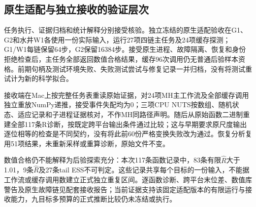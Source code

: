 \subsection{原生适配与独立接收的验证层次}
\label{sec:native-adapter-validation}
任务执行、证据归档和统计解释分别接受核验。独立冻结的原生适配验收在G1、G2和水井W1各使用一份实际输入，运行27项四链主任务及24项缓存探测；G1/W1每链保留64步，G2保留16384步。接受原生进程、故障隔离、恢复和身份拒绝检查后，主任务全部返回数值合格结果，缓存96次调用仍无普通后验样本资格。前期句柄及测试环境失败、失败测试尝试与修复记录一并归档，没有将测试重试计为新的科学拟合。

接收端在Mac上按完整任务表重读原始证据，对24项MH主工作流及全部缓存调用独立重放NumPy递推，接受事件失配均为0；三项CPU NUTS按数组、随机状态、适应记录和子进程证据核对，不作MH同路径声明。随后从原始函数二进制重建全部117条R诊断，按既定跨平台输出条件通过比较；这与早期要求原尺度输出逐位相等的检查是不同契约，没有将此前60份严格变换失败改为通过。恢复分析复用51项结果，未重新采样或重算诊断，原始文件不变。

数值合格仍不能解释为后验探索充分：本次117条函数记录中，83条有限$\hat R$大于1.01，9条$\hat R$及27条tail ESS不可判定。这些记录共享每个目标的一份输入，不能据工作流或缓存调用数建立正式独立重复区间。逐函数诊断、跨平台末位差、数值库警告及原生故障链见配套接收报告；当前证据支持该固定适配版本的有限运行与接收能力，九目标多预算的正式推断比较仍未冻结或执行。
